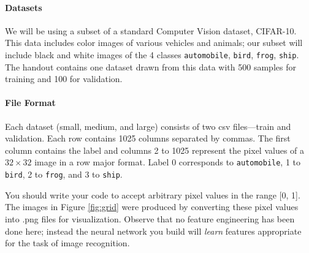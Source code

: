 \documentclass[11pt,addpoints,answers]{exam}
\begin{document}
\paragraph{Datasets} We will be using a subset of a standard Computer Vision dataset, CIFAR-10. This data includes color images of various vehicles and animals; our subset will include black and white images of the 4 classes \verb|automobile|, \verb|bird|, \verb|frog|, \verb|ship|. The handout contains one dataset drawn from this data with 500 samples for training and 100 for validation.


\paragraph{File Format} Each dataset (small, medium, and large) consists of two csv files---train and validation. Each row contains 1025 columns separated by commas. The first column contains the label and columns 2 to 1025 represent the pixel values of a $32 \times 32$ image in a row major format. Label 0 corresponds to \verb|automobile|, 1 to \verb|bird|, 2 to \verb|frog|, and 3 to \verb|ship|.
%

You should write your code to accept arbitrary pixel values in the range [0, 1]. The images in Figure \ref{fig:grid} were produced by converting these pixel values into .png files for visualization. Observe that no feature engineering has been done here; instead the neural network you build will \emph{learn} features appropriate for the task of image recognition.
\end{document}
